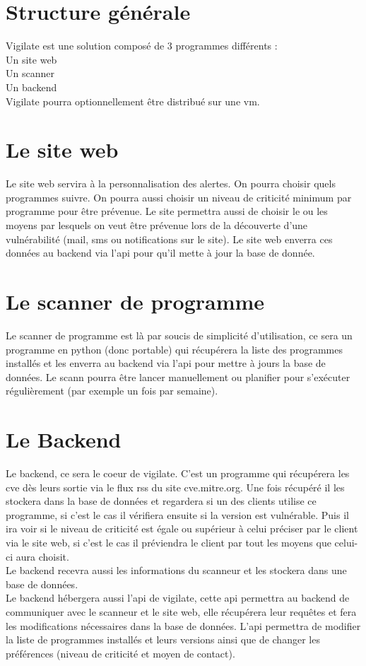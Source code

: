 \section{Structure générale}
Vigilate est une solution composé de 3 programmes différents :\\
Un site web\\
Un scanner\\
Un backend\\
Vigilate pourra optionnellement être distribué sur une vm.\\
\section{Le site web}
Le site web servira à la personnalisation des alertes. On pourra choisir quels programmes suivre. On pourra aussi choisir un niveau de criticité minimum par programme pour être prévenue. Le site permettra aussi de choisir le ou les moyens par lesquels on veut être prévenue lors de la découverte d’une vulnérabilité (mail, sms ou notifications sur le site). Le site web enverra ces données au backend via l’api pour qu’il mette à jour la base de donnée.\\

\section{Le scanner de programme}
Le scanner de programme est là par soucis de simplicité d’utilisation, ce sera un programme en python (donc portable) qui récupérera la liste des programmes installés et les enverra au backend via l’api pour mettre à jours la base de données. Le scann pourra être lancer manuellement ou planifier pour s’exécuter régulièrement (par exemple un fois par semaine).\\

\section{Le Backend}
Le backend, ce sera le coeur de vigilate. C’est un programme qui récupérera les cve dès leurs sortie via le flux rss du site cve.mitre.org. Une fois récupéré il les stockera dans la base de données et regardera si un des clients utilise ce programme, si c’est le cas il vérifiera ensuite si la version est vulnérable. Puis il ira voir si le niveau de criticité est égale ou supérieur à celui préciser par le client via le site web, si c’est le cas il préviendra le client par tout les moyens que celui-ci aura choisit.\\
Le backend recevra aussi  les informations du scanneur et les stockera dans une base de données.\\
Le backend hébergera aussi l’api de vigilate, cette api permettra au backend de communiquer avec le scanneur et le site web, elle récupérera leur requêtes et fera les modifications nécessaires dans la base de données. L’api permettra de modifier la liste de programmes installés et leurs versions ainsi que de changer les préférences (niveau de criticité et moyen de contact).\\

